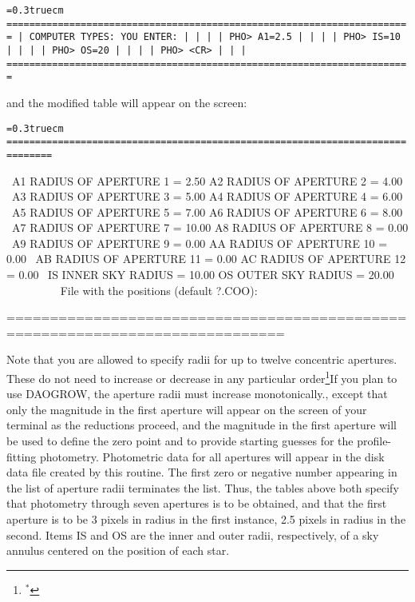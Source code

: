 \bigskip
{\noindent\obeylines\obeyspaces\frenchspacing\tt\baselineskip=0.3truecm
=======================================================================
| COMPUTER TYPES:                                  YOU ENTER:         |
|                                                                     |
| PHO>                                             A1=2.5             |
|                                                                     |
| PHO>                                             IS=10              |
|                                                                     |
| PHO>                                             OS=20              |
|                                                                     |
| PHO>                                             <CR>               |
|                                                                     |
=======================================================================
} 
\bigskip

\noindent and the modified table will appear on the screen:

\bigskip
{\noindent\obeylines\obeyspaces\frenchspacing\tt\baselineskip=0.3truecm
==============================================================================

\ A1  RADIUS OF APERTURE  1 =     2.50    A2  RADIUS OF APERTURE  2 =     4.00
\ A3  RADIUS OF APERTURE  3 =     5.00    A4  RADIUS OF APERTURE  4 =     6.00
\ A5  RADIUS OF APERTURE  5 =     7.00    A6  RADIUS OF APERTURE  6 =     8.00
\ A7  RADIUS OF APERTURE  7 =    10.00    A8  RADIUS OF APERTURE  8 =     0.00
\ A9  RADIUS OF APERTURE  9 =     0.00    AA  RADIUS OF APERTURE 10 =     0.00
\ AB  RADIUS OF APERTURE 11 =     0.00    AC  RADIUS OF APERTURE 12 =     0.00
\ IS       INNER SKY RADIUS =    10.00    OS       OUTER SKY RADIUS =    20.00
~~~~~~~~
\         File with the positions (default ?.COO):

==============================================================================
}
\bigskip

\noindent Note that you are allowed to specify radii for up to twelve
concentric apertures.  These do not need to increase or decrease in any
particular order\footnote{$^*$}{If you plan to use DAOGROW, the
aperture radii must increase monotonically.}, except that only the
magnitude in the first aperture will appear on the screen of your
terminal as the reductions proceed, and the magnitude in the first
aperture will be used to define the zero point and to provide starting
guesses for the profile-fitting photometry. Photometric data for all
apertures will appear in the disk data file created by this routine.
The first zero or negative number appearing in the list of aperture
radii terminates the list.  Thus, the tables above both specify that
photometry through seven apertures is to be obtained, and that the
first aperture is to be 3 pixels in radius in the first instance, 2.5
pixels in radius in the second.  Items IS and OS are the inner and
outer radii, respectively, of a sky annulus centered on the position of
each star.

